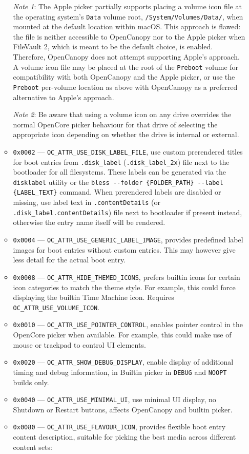 \documentclass[]{article}
\begin{document}
\begin{enumerate}
\begin{itemize}
    \emph{Note 1}: The Apple picker partially supports placing a volume icon file
    at the operating system's \texttt{Data} volume root, \texttt{/System/Volumes/Data/}, when
    mounted at the default location within macOS. This approach is flawed: the file is neither
    accessible to OpenCanopy nor to the Apple picker when FileVault 2, which is meant to be the
    default choice, is enabled. Therefore, OpenCanopy does not attempt supporting Apple's approach.
    A volume icon file may be placed at the root of the \texttt{Preboot} volume for compatibility
    with both OpenCanopy and the Apple picker, or use the \texttt{Preboot} per-volume location as
    above with OpenCanopy as a preferred alternative to Apple's approach. \medskip

    \emph{Note 2}: Be aware that using a volume icon on any drive overrides the normal
    OpenCore picker behaviour for that drive of selecting the appropriate icon depending
    on whether the drive is internal or external. \medskip

  \item \texttt{0x0002} --- \texttt{OC\_ATTR\_USE\_DISK\_LABEL\_FILE}, use custom
    prerendered titles for boot entries from \texttt{.disk\_label} (\texttt{.disk\_label\_2x})
    file next to the bootloader for all filesystems.
    These labels can be generated via the \texttt{disklabel} utility or the
    \texttt{bless -{}-folder \{FOLDER\_PATH\} -{}-label \{LABEL\_TEXT\}} command.
    When prerendered labels are disabled or missing, use label text in \texttt{.contentDetails}
    (or \texttt{.disk\_label.contentDetails}) file next to bootloader if present instead, otherwise
    the entry name itself will be rendered.
  \item \texttt{0x0004} --- \texttt{OC\_ATTR\_USE\_GENERIC\_LABEL\_IMAGE}, provides predefined
    label images for boot entries without custom entries. This may however give less detail for
    the actual boot entry.
  \item \texttt{0x0008} --- \texttt{OC\_ATTR\_HIDE\_THEMED\_ICONS}, prefers builtin icons
    for certain icon categories to match the theme style. For example, this could force
    displaying the builtin Time Machine icon. Requires \texttt{OC\_ATTR\_USE\_VOLUME\_ICON}.
  \item \texttt{0x0010} --- \texttt{OC\_ATTR\_USE\_POINTER\_CONTROL}, enables pointer control
  in the OpenCore picker when available. For example, this could make use of mouse or trackpad to
  control UI elements.
  \item \texttt{0x0020} --- \texttt{OC\_ATTR\_SHOW\_DEBUG\_DISPLAY}, enable display of additional
  timing and debug information, in Builtin picker in \texttt{DEBUG} and \texttt{NOOPT}
  builds only.
  \item \texttt{0x0040} --- \texttt{OC\_ATTR\_USE\_MINIMAL\_UI}, use minimal UI display, no
  Shutdown or Restart buttons, affects OpenCanopy and builtin picker.
  \item \texttt{0x0080} --- \texttt{OC\_ATTR\_USE\_FLAVOUR\_ICON}\label{oc-attr-use-flavour-icon},
  provides flexible boot entry content description, suitable for picking the best media across
  different content sets:


\end{itemize}
\end{enumerate}
\end{document}
